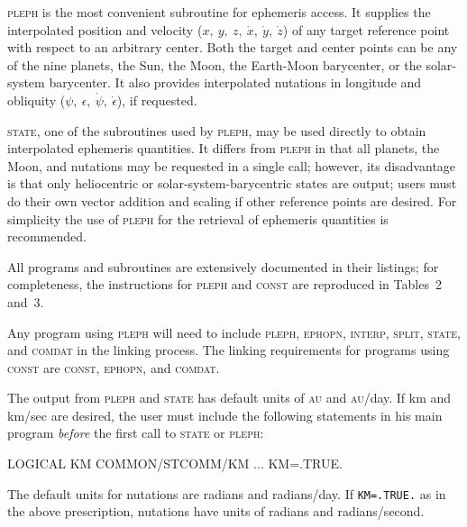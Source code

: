 \documentclass[twoside,11pt,nolof]{starlink}
\begin{document}
\textsc{pleph} is the most convenient subroutine for ephemeris access.
It supplies the interpolated position and velocity ($x,\>y,\>z,
\>\dot x,\>\dot y,\>\dot z$)
of any target reference point with respect to an arbitrary center.
Both the target and center points can be any of the nine
planets, the Sun, the Moon, the Earth-Moon barycenter, or the
solar-system barycenter. It also provides interpolated nutations
in longitude and obliquity ($\psi,\>\epsilon,\>\dot\psi,
\>\dot\epsilon$), if requested.

\textsc{state}, one of the subroutines used by \textsc{pleph},
may be used directly to obtain interpolated ephemeris quantities.
It differs from \textsc{pleph} in that all planets, the Moon, and
nutations may be requested in a single call; however, its disadvantage
is that only heliocentric or solar-system-barycentric states are output;
users must do their own vector addition and scaling if other
reference points are desired. For simplicity the use of \textsc{pleph}
for the retrieval of ephemeris quantities is recommended.

All programs and subroutines are extensively documented in their
listings; for completeness, the instructions for \textsc{pleph}
and \textsc{const} are reproduced in Tables~2 and~3.

Any program using \textsc{pleph} will need to include
\textsc{pleph, ephopn, interp, split, state}, and \textsc{comdat}
in the linking process. The linking requirements for
programs using \textsc{const} are \textsc{const, ephopn}, and
\textsc{comdat}.

The output from \textsc{pleph} and \textsc{state}
has default units of \textsc{au} and \textsc{au}/day. If km and km/sec
are desired, the user must include the following statements
in his main program \textit{before\/} the first call to \textsc{state}
or \textsc{pleph}:

%

\begin{terminalv}
        LOGICAL KM
        COMMON/STCOMM/KM
        ...
        KM=.TRUE.
\end{terminalv}

The default units for nutations are radians and radians/day. If
\texttt{KM=.TRUE.} as in the above prescription, nutations have units
of radians and radians/second.

\newpage                                             %
\end{document}
